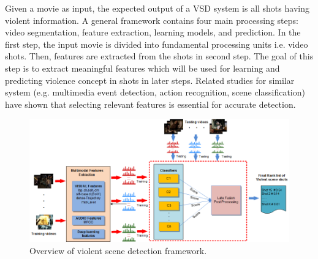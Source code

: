 \documentclass[twocolumn]{bmcart}%
\begin{document}
Given a movie as input, the expected output of a VSD system is all shots having violent information. A general framework \cite{demarty2014benchmarking,myers2014evaluating,oh2014multimedia} contains four main processing steps: video segmentation, feature extraction, learning models, and prediction. In the first step, the input movie is divided into fundamental processing units i.e. video shots. Then, features are extracted from the shots in second step. The goal of this step is to extract meaningful features which will be used for learning and predicting violence concept in shots in later steps. Related studies for similar system (e.g. multimedia event detection, action recognition, scene classification) have shown that selecting relevant features is essential for accurate detection.
\begin{figure}
	\centering
	\includegraphics[width=2\linewidth]{Images/Framework1.png}
	\caption{Overview of violent scene detection framework.}
	\label{fig:framework}
\end{figure}
\end{document}
